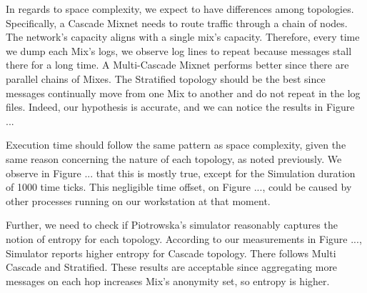 \documentclass[logo,msc,cyber]{infthesis}   %
\begin{document}
In regards to space complexity, we expect to have differences among topologies.
Specifically, a Cascade Mixnet needs to route traffic through a chain of
nodes. The network's capacity aligns with a single mix's capacity. Therefore,
every time we dump each Mix's logs, we observe log lines to repeat because
messages stall there for a long time. A Multi-Cascade Mixnet performs better
since there are parallel chains of Mixes. The Stratified topology should be the
best since messages continually move from one Mix to another and do not repeat
in the log files. Indeed, our hypothesis is accurate, and we can
notice the results in Figure ...

Execution time should follow the same pattern as space complexity, given the
same reason concerning the nature of each topology, as noted previously. We
observe in Figure ... that this is mostly true, except for the Simulation
duration of 1000 time ticks. This negligible time offset, on Figure ..., could
be caused by other processes running on our workstation at that moment.

Further, we need to check if Piotrowska's simulator reasonably captures the
notion of entropy for each topology. According to our measurements in Figure
..., Simulator reports higher entropy for Cascade topology. There follows Multi
Cascade and Stratified. These results are acceptable since aggregating more
messages on each hop increases Mix's anonymity set, so entropy is higher.
\end{document}
